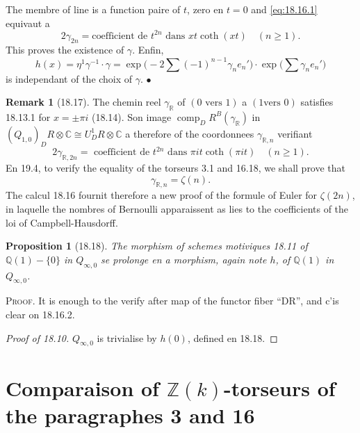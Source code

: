 \documentclass[12pt,a4paper]{article}
\theoremstyle{plain}
\newtheorem{proposition}[theorem]{Proposition}
\theoremstyle{definition}
\newtheorem{remark}[theorem]{Remark}
\theoremstyle{remark}
\DeclareMathOperator{\comp}{comp}
\newcommand{\Betti}{B}
\newcommand{\dR}{DR}
\newcommand{\ZZ}{\mathbb{Z}}
\newcommand{\QQ}{\mathbb{Q}}
\newcommand{\CC}{\mathbb{C}}
\newcommand{\RR}{\mathbb{R}}
\begin{document}
The membre of line is a function paire of $t$, zero en $t = 0$
and \eqref{eq:18.16.1} equivaut a
\begin{equation}\label{eq:18.16.2}
2\gamma_{2n} = \text{coefficient de } t^{2n} \text{ dans } xt
\coth(xt) \quad (n \geq 1).
\end{equation}
This proves the existence of $\gamma$. Enfin,
\[
h(x) = \eta^1 \gamma^{-1} \cdot \gamma =
\exp\bigl(-2\sum (-1)^{n-1} \gamma_n e_n'\bigr) \cdot
\exp\bigl(\sum \gamma_n e_n'\bigr)
\]
is independant of the choix of $\gamma$. \hfill $\bullet$

\begin{remark}[18.17]\label{rem:18.17}
The chemin reel $\gamma_\RR$ of $(0 \text{ vers } 1)$ a $(1 \text{
vers } 0)$ satisfies 18.13.1 for $x = \pm \pi i$ (18.14). Son image
$\comp_\dR^\Betti(\gamma_\RR)$ in $(Q_{1,0})_\dR \otimes \CC
\cong U^1_\dR \otimes \CC$ a therefore of the coordonnees
$\gamma_{\RR,n}$ verifiant
\begin{equation}\label{eq:18.17.1}
2\gamma_{\RR,2n} = \text{ coefficient de } t^{2n} \text{ dans }
\pi i t \coth(\pi i t) \quad (n \geq 1).
\end{equation}
En 19.4, to verify the equality of the torseurs 3.1 and 16.18, we shall prove that
\[
\gamma_{\RR,n} = \zeta(n).
\]
The calcul 18.16 fournit therefore a new proof of the formule
of Euler for $\zeta(2n)$, in laquelle the nombres of Bernoulli
apparaissent as lies to the coefficients of the loi of
Campbell-Hausdorff.
\end{remark}

\begin{proposition}[18.18]\label{prop:18.18}
The morphism of schemes motiviques 18.11 of $\QQ(1) - \{0\}$ in
$Q_{\infty,0}$ se prolonge en a morphism, again note $h$, of
$\QQ(1)$ in $Q_{\infty,0}$.
\end{proposition}

\noindent \textsc{Proof.} It is enough to the verify after map
of the functor fiber ``DR'', and c'is clear on 18.16.2.

\begin{proof}[Proof of 18.10]
$Q_{\infty,0}$ is trivialise by $h(0)$, defined en 18.18.
\end{proof}


\section{Comparaison of $\ZZ(k)$-torseurs of the paragraphes 3 and 16}\label{sec:19}
\end{document}
